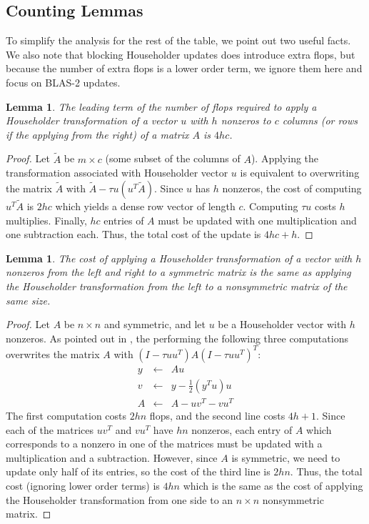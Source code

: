 \documentclass{article}
\newtheorem{lemma}[theorem]{Lemma}
\theoremstyle{definition}
\begin{document}
\subsection{Counting Lemmas}

To simplify the analysis for the rest of the table, we point out two useful facts.  We also note that blocking Householder updates does introduce extra flops, but because the number of extra flops is a lower order term, we ignore them here and focus on BLAS-2 updates.

\begin{lemma}
\label{lem:A1}
The leading term of the number of flops required to apply a Householder transformation of a vector $u$ with $h$ nonzeros to $c$ columns (or rows if the applying from the right) of a matrix $A$ is $4hc$.
\end{lemma}

\begin{proof}
Let $\tilde A$ be $m\times c$ (some subset of the columns of $A$).  Applying the transformation associated with Householder vector $u$ is equivalent to overwriting the matrix $\tilde A$ with $\tilde A-\tau u (u^T\tilde A)$.  Since $u$ has $h$ nonzeros, the cost of computing $u^T\tilde A$ is $2hc$ which yields a dense row vector of length $c$.  Computing $\tau u$ costs $h$ multiplies.  Finally, $hc$ entries of $A$ must be updated with one multiplication and one subtraction each.  Thus, the total cost of the update is $4hc+h$.
\end{proof}

\begin{lemma}
\label{lem:A2}
The cost of applying a Householder transformation of a vector with $h$ nonzeros from the left and right to a symmetric matrix is the same as applying the Householder transformation from the left to a nonsymmetric matrix of the same size.
\end{lemma}

\begin{proof}
Let $A$ be $n\times n$ and symmetric, and let $u$ be a Householder vector with $h$ nonzeros.  As pointed out in \cite{lawn02}, the performing the following three computations overwrites the matrix $A$ with $(I-\tau u u^T)A(I-\tau u u^T)^T$:
\begin{eqnarray*}
y & \leftarrow & Au \\
v & \leftarrow & y-\frac12(y^Tu)u \\
A & \leftarrow & A - uv^T - vu^T
\end{eqnarray*}
The first computation costs $2hn$ flops, and the second line costs $4h+1$. Since each of the matrices $uv^T$ and $vu^T$ have $hn$ nonzeros, each entry of $A$ which corresponds to a nonzero in one of the matrices must be updated with a multiplication and a subtraction.  However, since $A$ is symmetric, we need to update only half of its entries, so the cost of the third line is $2hn$.  Thus, the total cost (ignoring lower order terms) is $4hn$ which is the same as the cost of applying the Householder transformation from one side to an $n\times n$ nonsymmetric matrix.
\end{proof}
\end{document}
